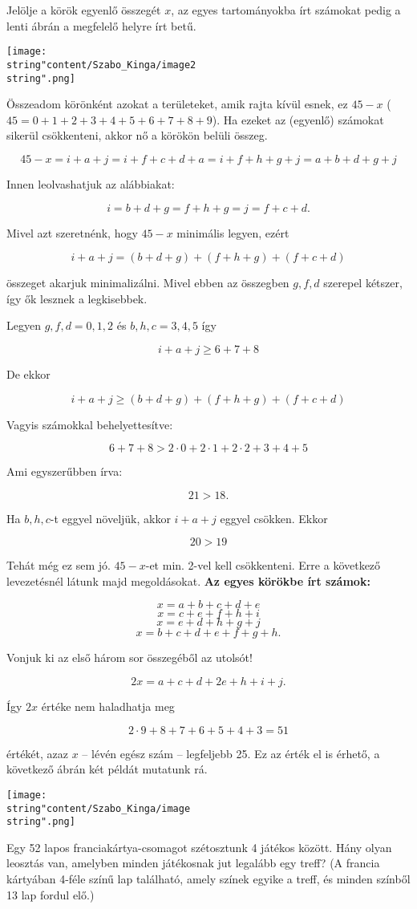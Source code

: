 \begin{solution}
Jelölje a körök egyenlő összegét $x$, az egyes tartományokba írt
számokat pedig a lenti ábrán a megfelelő helyre írt betű.
\begin{center}
\texttt{[image: \\string"content/Szabo\_Kinga/image2\\string".png]}
\par\end{center}
Összeadom körönként azokat a területeket, amik rajta kívül esnek,
ez $45-x$ ($45=0+1+2+3+4+5+6+7+8+9$). Ha ezeket az (egyenlő) számokat
sikerül csökkenteni, akkor nő a körökön belüli összeg.

\[
45-x=i+a+j=i+f+c+d+a=i+f+h+g+j=a+b+d+g+j
\]

Innen leolvashatjuk az alábbiakat:

\[
i=b+d+g=f+h+g=j=f+c+d.
\]

Mivel azt szeretnénk, hogy $45-x$ minimális legyen, ezért

\[
i+a+j=(b+d+g)+(f+h+g)+(f+c+d)
\]

összeget akarjuk minimalizálni. Mivel ebben az összegben $g,f,d$
szerepel kétszer, így ők lesznek a legkisebbek.

Legyen $g,f,d=0,1,2$ és $b,h,c=3,4,5$ így

\[
i+a+j\geq6+7+8
\]

De ekkor

\[
i+a+j\geq(b+d+g)+(f+h+g)+(f+c+d)
\]

Vagyis számokkal behelyettesítve:

\[
6+7+8>2\cdot0+2\cdot1+2\cdot2+3+4+5
\]

Ami egyszerűbben írva:

\[
21>18.
\]

Ha $b,h,c$-t eggyel növeljük, akkor $i+a+j$ eggyel csökken. Ekkor

\[
20>19
\]

Tehát még ez sem jó. $45-x$-et min. 2-vel kell csökkenteni. Erre
a következő levezetésnél látunk majd megoldásokat. \textbf{Az egyes
körökbe írt számok:}

\[
x=a+b+c+d+e
\]
\[
x=c+e+f+h+i
\]
\[
x=e+d+h+g+j
\]
\[
x=b+c+d+e+f+g+h.
\]

Vonjuk ki az első három sor összegéből az utolsót!

\[
2x=a+c+d+2e+h+i+j.
\]

Így $2x$ értéke nem haladhatja meg

\[
2\cdot9+8+7+6+5+4+3=51
\]

értékét, azaz $x$ -- lévén egész szám -- legfeljebb 25. Ez az érték
el is érhető, a következő ábrán két példát mutatunk rá.
\begin{center}
\texttt{[image: \\string"content/Szabo\_Kinga/image\\string".png]}
\par\end{center}
\end{solution}
\begin{extraproblem}
Egy 52 lapos franciakártya-csomagot szétosztunk 4 játékos között.
Hány olyan leosztás van, amelyben minden játékosnak jut legalább egy
treff? (A francia kártyában 4-féle színű lap található, amely színek
egyike a treff, és minden színből 13 lap fordul elő.) 
\end{extraproblem}

